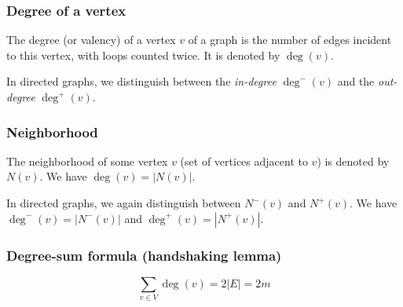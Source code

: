 \documentclass[a4paper]{article}
\begin{document}
\subsubsection{Degree of a vertex}
The degree (or valency) of a vertex $v$ of a graph is the number of edges incident to this vertex, with loops counted twice. It is denoted by $\deg(v)$.

In directed graphs, we distinguish between the \textit{in-degree} $\deg^-(v)$ and the \textit{out-degree} $\deg^+(v)$.

\subsubsection{Neighborhood}
The neighborhood of some vertex $v$ (set of vertices adjacent to $v$) is denoted by $N(v)$. We have $\deg\left(v\right)=\left\lvert N\left(v\right) \right\rvert$.

In directed graphs, we again distinguish between $N^-\left(v\right)$ and $N^+\left(v\right)$. We have $\deg^-(v)=|N^-(v)|$ and $\deg^+(v)=|N^+(v)|$.

\subsubsection{Degree-sum formula (handshaking lemma)}
$$\sum_{v\in V} \deg(v)=2|E|=2m$$
\end{document}
